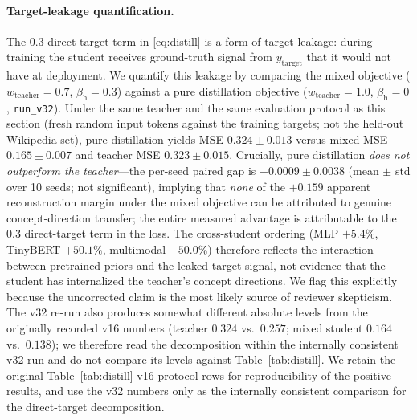 \documentclass[10pt,twoside]{article}
\theoremstyle{definition}
\begin{document}
\paragraph{Target-leakage quantification.}
The $0.3$ direct-target term in \eqref{eq:distill} is a form of target leakage: during training the student receives ground-truth signal from $y_{\text{target}}$ that it would not have at deployment. We quantify this leakage by comparing the mixed objective ($w_{\text{teacher}}=0.7$, $\beta_{\text{h}}=0.3$) against a pure distillation objective ($w_{\text{teacher}}=1.0$, $\beta_{\text{h}}=0$, \texttt{run\_v32}). Under the same teacher and the same evaluation protocol as this section (fresh random input tokens against the training targets; not the held-out Wikipedia set), pure distillation yields MSE $0.324 \pm 0.013$ versus mixed MSE $0.165 \pm 0.007$ and teacher MSE $0.323 \pm 0.015$. Crucially, pure distillation \emph{does not outperform the teacher}---the per-seed paired gap is $-0.0009 \pm 0.0038$ (mean $\pm$ std over 10 seeds; not significant), implying that \emph{none} of the $+0.159$ apparent reconstruction margin under the mixed objective can be attributed to genuine concept-direction transfer; the entire measured advantage is attributable to the $0.3$ direct-target term in the loss. The cross-student ordering (MLP $+5.4\%$, TinyBERT $+50.1\%$, multimodal $+50.0\%$) therefore reflects the interaction between pretrained priors and the leaked target signal, not evidence that the student has internalized the teacher's concept directions. We flag this explicitly because the uncorrected claim is the most likely source of reviewer skepticism. The v32 re-run also produces somewhat different absolute levels from the originally recorded v16 numbers (teacher $0.324$ vs.\ $0.257$; mixed student $0.164$ vs.\ $0.138$); we therefore read the decomposition within the internally consistent v32 run and do not compare its levels against Table~\ref{tab:distill}. We retain the original Table~\ref{tab:distill} v16-protocol rows for reproducibility of the positive results, and use the v32 numbers only as the internally consistent comparison for the direct-target decomposition.
\end{document}
